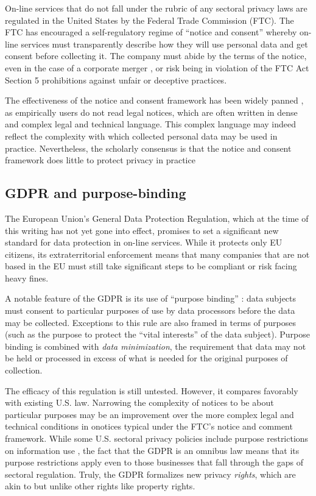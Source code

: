 \documentclass[../thesis.tex]{subfiles}
\begin{document}
On-line services that do
not fall under the rubric of any sectoral privacy
laws are regulated in the United States by the
Federal Trade Commission (FTC).
The FTC has encouraged a self-regulatory regime
of ``notice and consent'' whereby on-line services
must transparently describe how they will use
personal data and get consent before collecting it.
The company must abide by the terms of the notice,
even in the case of a corporate merger \cite{hine_2015},
or risk being in violation of the FTC Act Section 5
prohibitions against unfair or deceptive practices. 

The effectiveness of the notice and consent framework
has been widely panned \cite{barocas2009notice}
\cite{reidenberg2015privacy}, as empirically users do
not read legal notices, which are often written in
dense and complex legal and technical language.
This complex language may indeed reflect the complexity
with which collected personal data may be used
\cite{schaub2015design} in practice.
Nevertheless, the scholarly consensus is that
the notice and consent framework does little to
protect privacy in practice

\subsection{GDPR and purpose-binding}
\label{sec:GDPR}

The European Union's General Data Protection Regulation,
which at the time of this writing has not yet gone into
effect, promises to set a significant new standard for
data protection in on-line services.
While it protects only EU citizens, its extraterritorial
enforcement means that many companies that are not based in
the EU must still take significant steps to be compliant
or risk facing heavy fines.

A notable feature of the GDPR is its use of ``purpose binding''
\cite{hildebrandt2013slaves} \cite{herrmann2016privacy}:
data subjects must consent to particular purposes of use
by data processors before the data may be collected.
Exceptions to this rule are also framed in terms of purposes
(such as the purpose to protect the ``vital interests''
of the data subject).
Purpose binding is combined with \emph{data minimization},
the requirement
that data may not be held or processed in excess of what
is needed for the original purposes of collection.

The efficacy of this regulation is still untested.
However, it compares favorably with existing U.S. law.
Narrowing the complexity of notices to be about particular
purposes may be an improvement over the
more complex legal and technical conditions in onotices
typical under the FTC's notice and comment framework.
While some U.S. sectoral privacy policies include
purpose restrictions on information use
\cite{tschantz2012formalizing}, the fact that
the GDPR is an omnibus law means that its purpose
restrictions apply even to those businesses that
fall through the gaps of sectoral regulation.
Truly, the GDPR formalizes new privacy \emph{rights},
which are akin to but unlike other rights like
property rights.
\end{document}
